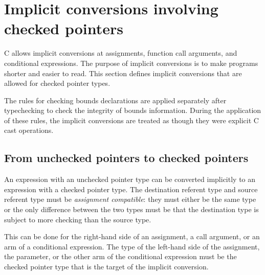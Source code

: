 \section{Implicit conversions involving checked pointers}
\label{section:implicit-conversions}

C allows implicit conversions at assignments, function call arguments,
and conditional expressions.  The purpose of
implicit conversions is to make programs shorter and easier to
read.  This section defines implicit conversions that are
allowed for checked pointer types.

The rules for checking bounds declarations are applied separately after 
typechecking to check the integrity of bounds information.  During the 
application of these rules, the implicit conversions are treated as
though they were explicit C cast operations.

\subsection{From unchecked pointers to checked pointers}
An expression with an unchecked pointer type can be converted implicitly to an
expression with a checked pointer type.   The destination referent type
and source referent type must be {\em assignment compatible}: they must
either be the same type or the only difference between the two types must be that
the destination type is subject to more checking than the source type.

This can be done for the right-hand side of an assignment, a call argument,
or an arm of a conditional expression.
The type of the left-hand side of the assignment, the parameter, or the other 
arm of the conditional expression must be the checked pointer type that is the
target of the implicit conversion.

